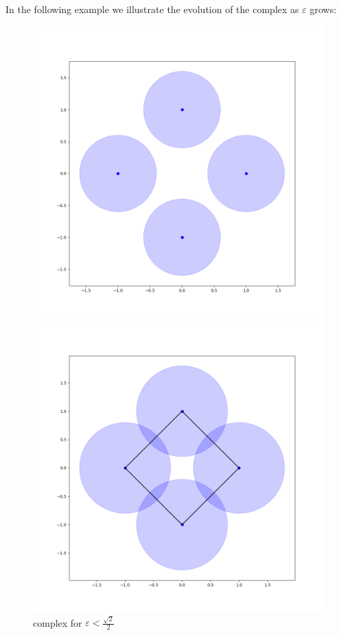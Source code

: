 \begin{example}
\label{examplecech}
In the following example we illustrate the evolution of the {\Cech}
complex as $\varepsilon$ grows:

\begin{figure}[!htb]
  \includegraphics[width=\linewidth]{imgs/cech_example_1_0_6.png}
  \caption*{
  {\Cech} complex for $\varepsilon<\frac{\sqrt{2}}{2}$
  }
  \label{fig:awesome_image1}
\endminipage\hfill
{}
  \includegraphics[width=\linewidth]{imgs/cech_example_1_0_8.png}

\end{figure}
\end{example}
